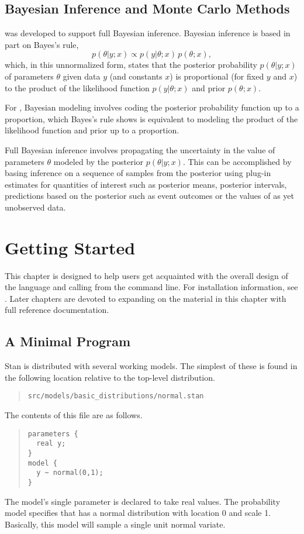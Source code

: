 \section{Bayesian Inference and Monte Carlo Methods}

\Stan was developed to support full Bayesian inference.  Bayesian
inference is based in part on Bayes's rule,
\[
p(\theta|y;x) \propto p(y|\theta;x) \, p(\theta;x),
\]
which, in this unnormalized form, states that the posterior
probability $p(\theta|y;x)$ of parameters $\theta$ given data $y$ (and
constants $x$) is proportional (for fixed $y$ and $x$) to the
product of the likelihood function $p(y|\theta;x)$ and prior
$p(\theta;x)$.

For \Stan, Bayesian modeling involves coding the posterior probability
function up to a proportion, which Bayes's rule shows is equivalent to
modeling the product of the likelihood function and prior up to a
proportion.

Full Bayesian inference involves propagating the uncertainty in the
value of parameters $\theta$ modeled by the posterior $p(\theta|y;x)$.
This can be accomplished by basing inference on a sequence of samples
from the posterior using plug-in estimates for quantities of interest
such as posterior means, posterior intervals, predictions based on the
posterior such as event outcomes or the values of as yet unobserved
data.



\chapter{Getting Started}

This chapter is designed to help users get acquainted with the overall
design of the \Stan language and calling \Stan from the command line.
For installation information, see .
Later chapters are devoted to expanding on the material in this
chapter with full reference documentation.


\section{A Minimal Program}

Stan is distributed with several working models.  The simplest of
these is found in the following location relative to the top-level
distribution.
%
\begin{quote}
\begin{Verbatim}
src/models/basic_distributions/normal.stan
\end{Verbatim}
\end{quote}
%
The contents of this file are as follows.
%
\begin{quote}
\begin{Verbatim}
parameters {
  real y;
}
model {
  y ~ normal(0,1);
}
\end{Verbatim}
\end{quote}
%
The model's single parameter  is declared to take real values.
The probability model specifies that  has a normal
distribution with location 0 and scale 1.  Basically, this model will
sample a single unit normal variate.  

